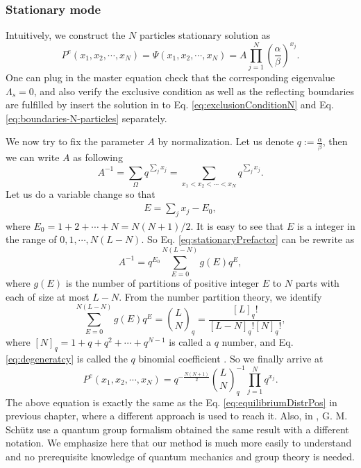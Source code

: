 \subsubsection{Stationary mode}
\label{ssub:Stationary mode}
Intuitively, we construct the $N$ particles stationary solution as
\begin{equation}
    \label{eq:stationaryN}
    P^e(x_1, x_2, \cdots, x_N) = \Psi(x_1, x_2, \cdots, x_N) =  A \prod_{j=1}^N\left(\frac{\alpha}{\beta}\right)^{x_j}.
\end{equation}
One can plug in the master equation check that the corresponding eigenvalue $\Lambda_s= 0$, and also verify the exclusive condition as well as the reflecting boundaries are fulfilled by insert the solution in to Eq.  \eqref{eq:exclusionConditionN} and Eq. \eqref{eq:boundaries-N-particles} separately.

We now try to fix the parameter $A$ by normalization. Let us denote $q:=\frac{\alpha}{\beta}$, then we can write $A$ as following
\begin{equation}
    \label{eq:stationaryPrefactor}
    A^{-1} = \sum_{\Omega} q^{\sum_j{x_j}} = 
    \sum_{x_1 < x_2 < \cdots < x_N} q^{\sum_j{x_j}}.
\end{equation}
Let us do a variable change so that 
\begin{align*}
    E = \sum_j{x_j} - E_0,
\end{align*}
where $E_0 = 1 + 2 + \cdots + N = N(N+1)/2$. It is easy to see that $E$ is a integer in the range of $0, 1, \cdots, N(L-N)$. So Eq. \eqref{eq:stationaryPrefactor} can be rewrite as 
\begin{equation}
    \label{eq:prefactorRewrite}
    A^{-1} = q^{E_0}\sum_{E=0}^{N(L-N)}g(E)q^E,
\end{equation}
where $g(E)$ is the number of partitions of positive integer $E$ to $N$ parts with each of size at most $L-N$. From the number partition theory, we identify
\begin{equation}
    \label{eq:degeneratcy}
    \sum_{E=0}^{N(L-N)}g(E)q^E = \binom{L}{N}_q =
    \frac{[L]_q!}{[L-N]_q![N]_q!},
\end{equation}
where $[N]_q = 1 + q + q^2 + \cdots + q^{N-1}$ is called a $q$ number, and Eq.  \eqref{eq:degeneratcy} is called the $q$ binomial coefficient \cite{Andrews1998}. So we finally arrive at 
\begin{equation}
    \label{eq:stationarySolutionN}
    P^e(x_1, x_2, \cdots, x_N) = q^{-\frac{N(N+1)}{2}}
    \binom{L}{N}_q^{-1}\prod_{j=1}^N{q^{x_j}}.
\end{equation}
The above equation is exactly the same as the Eq. \eqref{eq:equilibriumDistrPos} in previous chapter, where a different approach is used to reach it. Also, in \cite{Sandow1994}, G. M. Sch\"{u}tz use a quantum group formalism obtained the same result with a different notation. We emphasize here that our method is much more easily to understand and no prerequisite knowledge of quantum mechanics and group theory is needed.

